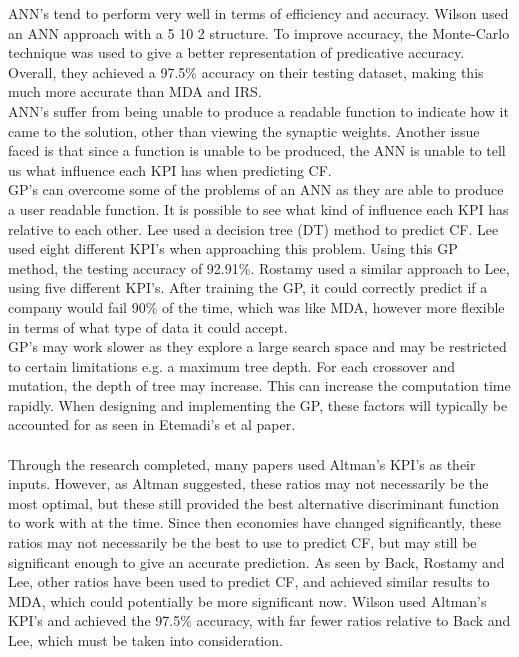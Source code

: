 \documentclass[11pt]{article}
\begin{document}
ANN's tend to perform very well in terms of efficiency and accuracy. Wilson used an ANN approach with a 5 10 2 structure. To improve accuracy, the Monte-Carlo technique was used to give a better representation of predicative accuracy. Overall, they achieved a 97.5\% accuracy on their testing dataset, making this much more accurate than MDA and IRS. \\
ANN's suffer from being unable to produce a readable function to indicate how it came to the solution, other than viewing the synaptic weights. Another issue faced  is that since a function is unable to be produced, the ANN is unable to tell us what influence each KPI has when predicting CF.\\
GP's can overcome some of the problems of an ANN as they are able to produce a user readable function. It is possible to see what kind of influence each KPI has relative to each other. Lee used a decision tree (DT) method to predict CF. Lee used eight different KPI's when approaching this problem. Using this GP method, the testing accuracy of 92.91\%. Rostamy used a similar approach to Lee, using five different KPI's. After training the GP, it could correctly predict if a company would fail 90\% of the time, which was like MDA, however more flexible in terms of what type of data it could accept. \\
GP's may work slower as they explore a large search space and may be restricted to certain limitations e.g. a maximum tree depth. For each crossover and mutation, the depth of tree may increase. This can increase the computation time rapidly. When designing and implementing the GP, these factors will typically be accounted for as seen in Etemadi's et al paper. \\
\\
Through the research completed, many papers used Altman's KPI's as their inputs. However, as Altman suggested, these ratios may not necessarily be the most optimal, but these still provided the best alternative discriminant function to work with at the time. Since then economies have changed significantly, these ratios may not necessarily be the best to use to predict CF, but may still be significant enough to give an accurate prediction. As seen by Back, Rostamy and Lee, other ratios have been used to predict CF, and achieved similar results to MDA, which could potentially be more significant now. Wilson used Altman's KPI's and achieved the 97.5\% accuracy, with far fewer ratios relative to Back and Lee, which must be taken into consideration.
\end{document}
